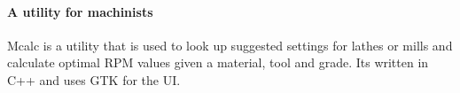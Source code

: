\paragraph*{A utility for machinists}

Mcalc is a utility that is used to look up suggested settings for lathes or mills and calculate optimal R\+PM values given a material, tool and grade. It\textquotesingle{}s written in C++ and uses G\+TK for the UI. 